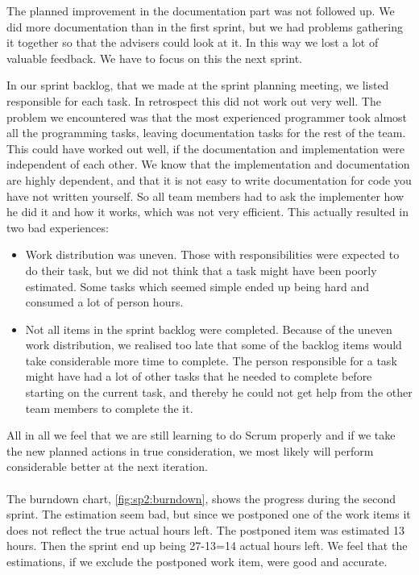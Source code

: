 The planned improvement in the documentation part was not followed up. We did more documentation than in the first sprint, but we had problems gathering it together so that the advisers could look at it. In this way we lost a lot of valuable feedback. We have to focus on this the next sprint.

In our sprint backlog, that we made at the sprint planning meeting, we listed responsible for each task. In retrospect this did not work out very well. The problem we encountered was that the most experienced programmer took almost all the programming tasks, leaving documentation tasks for the rest of the team. This could have worked out well, if the documentation and implementation were independent of each other. We know that the implementation and documentation are highly dependent, and that it is not easy to write documentation for code you have not written yourself. So all team members had to ask the implementer how he did it and how it works, which was not very efficient. 
This actually resulted in two bad experiences:
\begin{itemize}
\item Work distribution was uneven. Those with responsibilities were expected to do their task, but we did not think that a task might have been poorly estimated. Some tasks which seemed simple ended up being hard and consumed a lot of person hours.
\item Not all items in the sprint backlog were completed. Because of the uneven work distribution, we realised too late that some of the backlog items would take considerable more time to complete. The person responsible for a task might have had a lot of other tasks that he needed to complete before starting on the current task, and thereby he could not get help from the other team members to complete the it.
\end{itemize} 
 All in all we feel that we are still learning to do Scrum properly and if we take the new planned actions in true consideration, we most likely will perform considerable better at the next iteration. 
\\
\\
The burndown chart, \autoref{fig:sp2:burndown}, shows the progress during the second sprint. The estimation seem bad, but since we postponed one of the work items it does not reflect the true actual hours left. The postponed item was estimated 13 hours. Then the sprint end up being 27-13=14 actual hours left. We feel that the estimations, if we exclude the postponed work item, were good and accurate.
